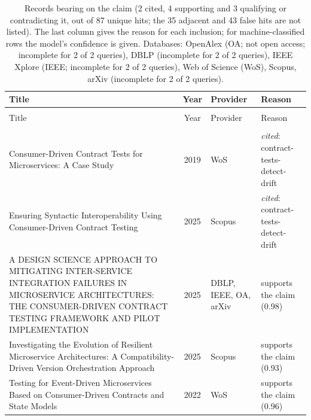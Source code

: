 
\begingroup\footnotesize
\begin{longtable}{@{}%
  >{\raggedright\arraybackslash}p{}c%
  >{\raggedright\arraybackslash}p{}%
  >{\raggedright\arraybackslash}p{}@{}}
\caption{Records bearing on the claim (2 cited, 4 supporting and 3 qualifying or contradicting it, out of 87 unique hits; the 35 adjacent and 43 false hits are not listed). The last column gives the reason for each inclusion; for machine-classified rows the model's confidence is given. Databases: OpenAlex (OA; not open access; incomplete for 2 of 2 queries), DBLP (incomplete for 2 of 2 queries), IEEE Xplore (IEEE; incomplete for 2 of 2 queries), Web of Science (WoS), Scopus, arXiv (incomplete for 2 of 2 queries).}\label{tab:t-contract-tests}\\
\toprule
Title & Year & Provider & Reason \\
\midrule
\endfirsthead
\multicolumn{4}{@{}l}{\emph{\tablename~\thetable{} (cont.)}}\\
\toprule
Title & Year & Provider & Reason \\
\midrule
\endhead
\midrule \multicolumn{4}{r@{}}{\emph{continued on next page}}\\
\endfoot
\bottomrule
\endlastfoot
Consumer-Driven Contract Tests for Microservices: A Case Study & 2019 & WoS & \emph{cited}: contract-tests-detect-drift \\
Ensuring Syntactic Interoperability Using Consumer-Driven Contract Testing & 2025 & Scopus & \emph{cited}: contract-tests-detect-drift \\
A DESIGN SCIENCE APPROACH TO MITIGATING INTER-SERVICE INTEGRATION FAILURES IN MICROSERVICE ARCHITECTURES: THE CONSUMER-DRIVEN CONTRACT TESTING FRAMEWORK AND PILOT IMPLEMENTATION & 2025 & DBLP, IEEE, OA, arXiv & supports the claim (0.98) \\
Investigating the Evolution of Resilient Microservice Architectures: A Compatibility-Driven Version Orchestration Approach & 2025 & Scopus & supports the claim (0.93) \\
Testing for Event-Driven Microservices Based on Consumer-Driven Contracts and State Models & 2022 & WoS & supports the claim (0.96) \\

\end{longtable}
